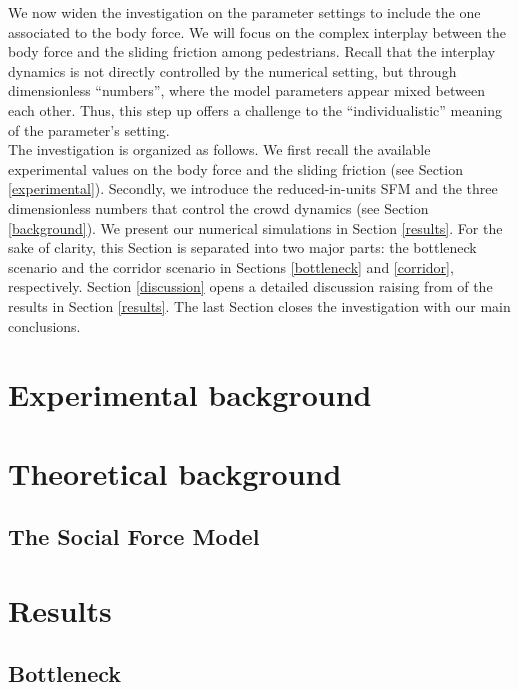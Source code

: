 \documentclass[preprint,12pt]{elsarticle}
\begin{document}
We now widen the investigation on the parameter settings to include the one 
associated to the body force. We will focus on the complex interplay between 
the body force and the sliding friction among pedestrians. Recall that the 
interplay dynamics is not directly controlled by the numerical setting, but 
through dimensionless ``numbers'', where the model parameters appear mixed 
between each other. Thus, this step up offers a challenge to the 
``individualistic'' meaning of the parameter's setting. \\  


The investigation is organized as follows. We first recall the available 
experimental values on the body force and the sliding friction (see Section 
\ref{experimental}). Secondly, we introduce the reduced-in-units SFM and the 
three dimensionless numbers that control the crowd dynamics (see Section 
\ref{background}). We present our numerical simulations in Section 
\ref{results}. For the sake of clarity, this Section is 
separated into two major parts: the bottleneck scenario and the corridor 
scenario in Sections \ref{bottleneck} and \ref{corridor}, respectively. 
Section \ref{discussion} opens a detailed discussion raising from of the results 
in Section \ref{results}. The last Section closes the investigation with our 
main conclusions.

\section{\label{experimental}Experimental background}

\section{\label{background}Theoretical background}

\subsection{\label{sfm}The Social Force Model}


\section{\label{results}Results}


\subsection{\label{bottleneck} Bottleneck}
\end{document}
